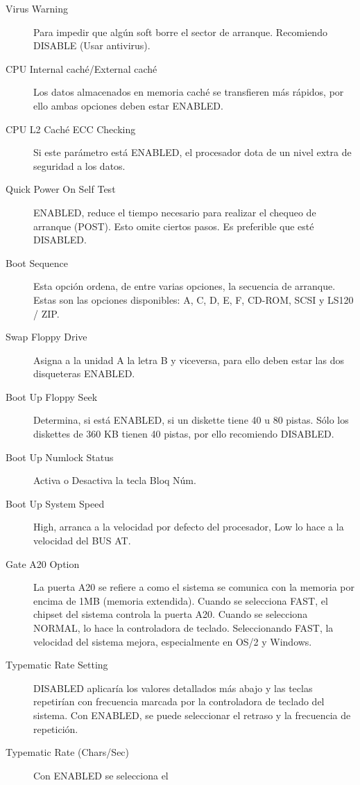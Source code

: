 			\begin{description}
				\item[Virus Warning] Para impedir que algún soft borre el
					sector de arranque. Recomiendo DISABLE (Usar antivirus).
				\item[CPU Internal caché/External caché] Los datos almacenados
					en memoria caché se transfieren más rápidos, por ello ambas
					opciones deben estar ENABLED.
				\item[CPU L2 Caché ECC Checking] Si este parámetro está
					ENABLED, el procesador dota de un nivel extra de seguridad
					a los datos.
				\item[Quick Power On Self Test] ENABLED, reduce el tiempo
					necesario para realizar el chequeo de arranque (POST). Esto
					omite ciertos pasos. Es preferible que esté DISABLED.
				\item[Boot Sequence] Esta opción ordena, de entre varias
					opciones, la secuencia de arranque. Estas son las opciones
					disponibles: A, C, D, E, F, CD-ROM, SCSI y LS120 / ZIP.
				\item[Swap Floppy Drive] Asigna a la unidad A la letra B y
					viceversa, para ello deben estar las dos disqueteras
					ENABLED.
				\item[Boot Up Floppy Seek] Determina, si está ENABLED, si un
					diskette tiene 40 u 80 pistas. Sólo los diskettes de 360 KB
					tienen 40 pistas, por ello recomiendo DISABLED.
				\item[Boot Up Numlock Status] Activa o Desactiva la tecla Bloq
					Núm.
				\item[Boot Up System Speed] High, arranca a la velocidad por
					defecto del procesador, Low lo hace a la velocidad del BUS
					AT.
				\item[Gate A20 Option] La puerta A20 se refiere a como el
					sistema se comunica con la memoria por encima de 1MB
					(memoria extendida). Cuando se selecciona FAST, el chipset
					del sistema controla la puerta A20. Cuando se selecciona
					NORMAL, lo hace la controladora de teclado. Seleccionando
					FAST, la velocidad del sistema mejora, especialmente en
					OS/2 y Windows.
				\item[Typematic Rate Setting] DISABLED aplicaría los valores
					detallados más abajo y las teclas repetirían con frecuencia
					marcada por la controladora de teclado del sistema. Con
					ENABLED, se puede seleccionar el retraso y la frecuencia de
					repetición.
				\item[Typematic Rate (Chars/Sec)] Con ENABLED se selecciona el

\end{description}
